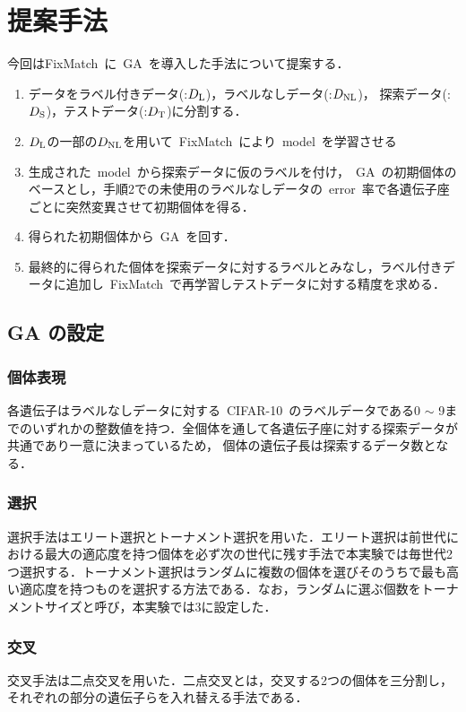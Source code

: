 \documentclass[twocolumn]{jarticle}     %
\begin{document}
\section{提案手法}
今回はFixMatch\ に\ GA\ を導入した手法について提案する．
\begin{enumerate}
	\item データをラベル付きデータ(:$D_{\rm L}$)，ラベルなしデータ(:$D_{\rm {NL}}$)， 探索データ(:$D_{\rm S}$)，テストデータ(:$D_{\rm T}$)に分割する．
	\item $D_{\rm L}$の一部の$D_{\rm {NL}}$を用いて\ FixMatch\ により\ model\ を学習させる
	\item 生成された\ model\ から探索データに仮のラベルを付け，\ GA\ の初期個体のベースとし，手順2での未使用のラベルなしデータの\ error\ 率で各遺伝子座ごとに突然変異させて初期個体を得る．
	\item 得られた初期個体から\ GA\ を回す．
	\item 最終的に得られた個体を探索データに対するラベルとみなし，ラベル付きデータに追加し\ FixMatch\ で再学習しテストデータに対する精度を求める．
\end{enumerate}

\subsection{GA の設定}
\subsubsection{個体表現}
各遺伝子はラベルなしデータに対する\ CIFAR-10\ のラベルデータである0 $\sim$ 9までのいずれかの整数値を持つ．全個体を通して各遺伝子座に対する探索データが共通であり一意に決まっているため，
個体の遺伝子長は探索するデータ数となる．

\subsubsection{選択}
選択手法はエリート選択とトーナメント選択を用いた．エリート選択は前世代における最大の適応度を持つ個体を必ず次の世代に残す手法で本実験では毎世代2つ選択する．トーナメント選択はランダムに複数の個体を選びそのうちで最も高い適応度を持つものを選択する方法である．なお，ランダムに選ぶ個数をトーナメントサイズと呼び，本実験では3に設定した．

\subsubsection{交叉}
交叉手法は二点交叉を用いた．二点交叉とは，交叉する2つの個体を三分割し，それぞれの部分の遺伝子らを入れ替える手法である．
\end{document}
